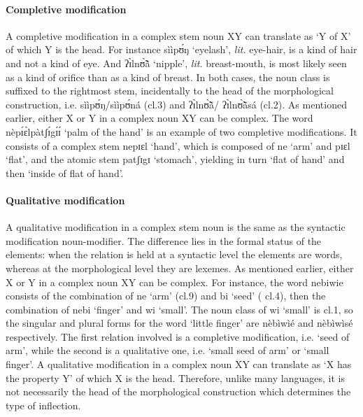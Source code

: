 \begin{exe}
\begin{exe}
\begin{exe}
{\begin{exe}
\begin{exe}
\begin{exe}
\begin{exe}
\paragraph{Completive modification}
\label{sec:GRM-comp-completive}

A completive modification in a complex stem noun XY can translate as `Y of X' 
of 
which Y is the head. For instance {\sls sììpʊ́ŋ}   `eyelash', {\it lit.} 
eye-hair, is a kind of hair and not a kind of eye. And {\sls ʔɪ̀lnʊ̃̀ã̀} 
`nipple', {\it lit.} breast-mouth, is most likely seen as a kind of orifice 
than 
as  a kind of breast.  In both cases, the noun class is suffixed to the 
rightmost stem, incidentally to the head of the morphological construction, 
i.e. 
{\sls sììpʊ́ŋ}/{\sls sììpʊ́ná} {\sc (cl.3)} and {\sls ʔɪ̀lnʊ̃̀ã̀}/{\sls 
ʔɪ̀lnʊ̃̀ã̀sá} {\sc (cl.2)}. As mentioned earlier,  either X or Y  in a 
complex 
noun XY can be complex. The word {\sls nèpɪ́ɛ̀lpàtʃɪ́gɪ́ɪ́} `palm of the 
hand' 
is an example of two completive modifications. It consists of a complex stem 
{\sls nepɪɛl} `hand', which is composed of  {\sls ne} `arm' and {\sls pɪɛl} 
`flat', 
and the atomic stem {\sls patʃɪgɪ} `stomach', yielding in turn  `flat of hand' 
and then `inside of flat of hand'. 


\paragraph{Qualitative modification}
\label{sec:GRM-comp-quality}

A qualitative modification in a complex stem noun is the same as the  syntactic
modification  noun-modifier. The difference lies in the formal status of the
elements: when the
relation is held at a syntactic level the elements are words, whereas at the
morphological level they are lexemes. As mentioned earlier,  either X or Y  in a
complex noun XY can be complex. For instance, the word {\sls nebiwie} consists 
of
the combination of {\sls ne}  `arm' ({\sc cl.9}) and {\sls bi} `seed' ({\sc
cl.4}), then the combination of {\sls nebi} `finger' and {\sls wi} `small'. The 
noun class  of {\sls wi} `small'  is {\sc cl.1}, so the singular and plural
forms for the word `little finger' are {\sls nèbìwìé} and  {\sls 
nèbìwìsé}
respectively. The first relation involved is a completive modification, i.e.
`seed  of arm', while the second is a qualitative one, i.e. `small seed  of
arm' or `small finger'.  A qualitative modification in a complex noun XY can
translate as `X has
the property Y'  of which X is the head. Therefore, unlike many languages,  it
is not necessarily the head of the morphological construction which determines
the type of inflection.



\end{exe}
\end{exe}
\end{exe}
\end{exe}}
\end{exe}
\end{exe}
\end{exe}

